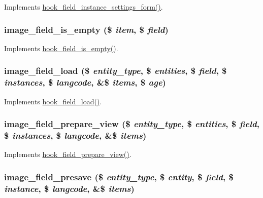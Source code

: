 \label{image_8field_8inc_a0fb703ddacaa5e38cdc62b33786aecac}
Implements \hyperlink{group__field__types_gacce0ff92e36c0054ad131d95e576a13a}{hook\_\-field\_\-instance\_\-settings\_\-form()}. \hypertarget{image_8field_8inc_ab622afc8da1677afd5a91fc89c1192e0}{
\subsubsection[{image\_\-field\_\-is\_\-empty}]{\setlength{\rightskip}{0pt plus 5cm}image\_\-field\_\-is\_\-empty (\$ {\em item}, \/  \$ {\em field})}}
\label{image_8field_8inc_ab622afc8da1677afd5a91fc89c1192e0}
Implements \hyperlink{group__field__types_ga192dd7e7a02a7bc9e0af8b67b187b071}{hook\_\-field\_\-is\_\-empty()}. \hypertarget{image_8field_8inc_a863cf5e04ef81f3b8e4dfece71766af1}{
\subsubsection[{image\_\-field\_\-load}]{\setlength{\rightskip}{0pt plus 5cm}image\_\-field\_\-load (\$ {\em entity\_\-type}, \/  \$ {\em entities}, \/  \$ {\em field}, \/  \$ {\em instances}, \/  \$ {\em langcode}, \/  \&\$ {\em items}, \/  \$ {\em age})}}
\label{image_8field_8inc_a863cf5e04ef81f3b8e4dfece71766af1}
Implements \hyperlink{group__field__types_ga37f2456e9b5b8b39dc11cffd59163c19}{hook\_\-field\_\-load()}. \hypertarget{image_8field_8inc_a5d3586894f3a316c3d7c88455d0cd30b}{
\subsubsection[{image\_\-field\_\-prepare\_\-view}]{\setlength{\rightskip}{0pt plus 5cm}image\_\-field\_\-prepare\_\-view (\$ {\em entity\_\-type}, \/  \$ {\em entities}, \/  \$ {\em field}, \/  \$ {\em instances}, \/  \$ {\em langcode}, \/  \&\$ {\em items})}}
\label{image_8field_8inc_a5d3586894f3a316c3d7c88455d0cd30b}
Implements \hyperlink{group__field__types_ga02a3004a67ecba2b81eaa63b05d08cc8}{hook\_\-field\_\-prepare\_\-view()}. \hypertarget{image_8field_8inc_a6bbe53bf7c5f4bd0a98bc61557ef861b}{
\subsubsection[{image\_\-field\_\-presave}]{\setlength{\rightskip}{0pt plus 5cm}image\_\-field\_\-presave (\$ {\em entity\_\-type}, \/  \$ {\em entity}, \/  \$ {\em field}, \/  \$ {\em instance}, \/  \$ {\em langcode}, \/  \&\$ {\em items})}}
